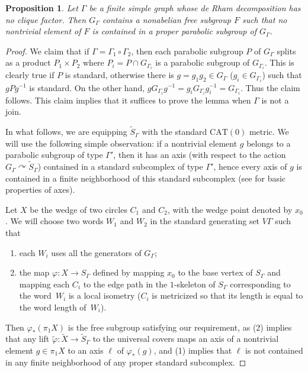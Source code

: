 \documentclass[11pt]{article}
\numberwithin{equation}{section}
\theoremstyle{plain}
\newtheorem{prop}[theo]{Proposition}
\theoremstyle{definition}
\let\actson\curvearrowright
\begin{document}
\begin{prop}\label{prop:kim-koberda}
Let $\Gamma$ be a finite simple graph whose de Rham decomposition has no clique factor. Then $G_\Gamma$ contains a nonabelian free subgroup $F$ such that no nontrivial element of $F$ is contained in a proper parabolic subgroup of $G_\Gamma$.
\end{prop}
\begin{proof}
We claim that if $\Gamma=\Gamma_1\circ\Gamma_2$, then each parabolic subgroup $P$ of $G_\Gamma$ splits as a product $P_1\times P_2$ where $P_i=P\cap G_{\Gamma_i}$ is a parabolic subgroup of $G_{\Gamma_i}$. This is clearly true if $P$ is standard, otherwise there is $g=g_1g_2\in G_{\Gamma}$ ($g_i\in G_{\Gamma_i}$) such that $gPg^{-1}$ is standard. On the other hand, $gG_{\Gamma_i}g^{-1}=g_i G_{\Gamma_i} g^{-1}_i=G_{\Gamma_i}$. Thus the claim follows. This claim implies that it suffices to prove the lemma when $\Gamma$ is not a join.

In what follows, we are equipping $\widetilde{S}_\Gamma$ with the standard $\mathrm{CAT}(0)$ metric.
We will use the following simple observation: if a nontrivial element $g$ belongs to a parabolic subgroup of type $\Gamma'$, then it has an axis (with respect to the action $G_\Gamma\actson \widetilde{S}_\Gamma$) contained in a standard subcomplex of type $\Gamma'$, hence every axis of $g$ is contained in a finite neighborhood of this standard subcomplex (see \cite[Chap.\,II.6]{bridson2013metric} for basic properties of axes).


Let $X$ be the wedge of two circles $C_1$ and $C_2$, with the wedge point denoted by $x_0$. We will choose two words $W_1$ and $W_2$ in the standard generating set $V\Gamma$ such that
\begin{enumerate}
\item[(1)] each $W_i$ uses all the generators of $G_\Gamma$;
\item[(2)] the map $\varphi:X\to S_\Gamma$ defined by mapping $x_0$ to the base vertex of $S_\Gamma$ and mapping each $C_i$ to the edge path in the $1$-skeleton of $S_\Gamma$ corresponding to the word~$W_i$ is a local isometry ($C_i$ is metricized so that its length is equal to the word length of~$W_i$).
\end{enumerate}
Then $\varphi_\ast(\pi_1 X)$ is the free subgroup satisfying our requirement, as (2) implies that any lift $\tilde \varphi:\widetilde X\to \widetilde{S}_\Gamma$ to the universal covers maps an axis of a nontrivial element $g\in \pi_1 X$ to an axis $\ell$ of $\varphi_\ast(g)$, and (1) implies that $\ell$ is not contained in any finite neighborhood of any proper standard subcomplex.


\end{proof}
\end{document}
